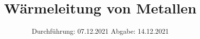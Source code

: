 

\subject{V204}
\title{Wärmeleitung von Metallen}
\date{%
  Durchführung: 07.12.2021
  \hspace{3em}
  Abgabe: 14.12.2021
}



\maketitle
\thispagestyle{empty}
\tableofcontents
\newpage





\printbibliography{}
\appendix
\newpage



